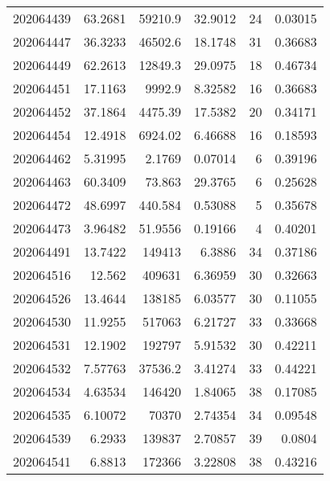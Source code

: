 \begin{tabular}{rrrrrr}
 202064439 &         63.2681  &    59210.9    &           32.9012  &          24 & 0.03015 \\
 202064447 &         36.3233  &    46502.6    &           18.1748  &          31 & 0.36683 \\
 202064449 &         62.2613  &    12849.3    &           29.0975  &          18 & 0.46734 \\
 202064451 &         17.1163  &     9992.9    &            8.32582 &          16 & 0.36683 \\
 202064452 &         37.1864  &     4475.39   &           17.5382  &          20 & 0.34171 \\
 202064454 &         12.4918  &     6924.02   &            6.46688 &          16 & 0.18593 \\
 202064462 &          5.31995 &        2.1769 &            0.07014 &           6 & 0.39196 \\
 202064463 &         60.3409  &       73.863  &           29.3765  &           6 & 0.25628 \\
 202064472 &         48.6997  &      440.584  &            0.53088 &           5 & 0.35678 \\
 202064473 &          3.96482 &       51.9556 &            0.19166 &           4 & 0.40201 \\
 202064491 &         13.7422  &   149413      &            6.3886  &          34 & 0.37186 \\
 202064516 &         12.562   &   409631      &            6.36959 &          30 & 0.32663 \\
 202064526 &         13.4644  &   138185      &            6.03577 &          30 & 0.11055 \\
 202064530 &         11.9255  &   517063      &            6.21727 &          33 & 0.33668 \\
 202064531 &         12.1902  &   192797      &            5.91532 &          30 & 0.42211 \\
 202064532 &          7.57763 &    37536.2    &            3.41274 &          33 & 0.44221 \\
 202064534 &          4.63534 &   146420      &            1.84065 &          38 & 0.17085 \\
 202064535 &          6.10072 &    70370      &            2.74354 &          34 & 0.09548 \\
 202064539 &          6.2933  &   139837      &            2.70857 &          39 & 0.0804  \\
 202064541 &          6.8813  &   172366      &            3.22808 &          38 & 0.43216 \\

\end{tabular}
